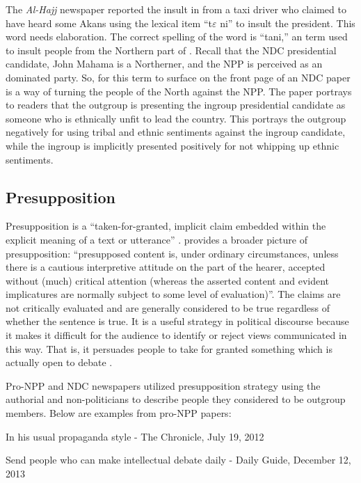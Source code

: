 \documentclass[output=paper,modfonts]{langscibook}
\begin{document}
The \textit{Al-Hajj} newspaper reported the insult in  from a taxi driver who claimed to have heard some Akans using the lexical item “t$\varepsilon $ ni” to insult the president. This word needs elaboration. The correct spelling of the word is “tani,” an  term used to insult people from the Northern part of . Recall that the NDC presidential candidate, John Mahama is a Northerner, and the NPP is perceived as an  dominated party. So, for this term to surface on the front page of an NDC paper is a way of turning the people of the North against the NPP. The paper portrays to readers that the outgroup is presenting the ingroup presidential candidate as someone who is ethnically unfit to lead the country. This portrays the outgroup negatively for using tribal and ethnic sentiments against the ingroup candidate, while the ingroup is implicitly presented positively for not whipping up ethnic sentiments.

\subsection{Presupposition}\label{sec:ofori:3.2}

Presupposition is a “taken-for-granted, implicit claim embedded within the explicit meaning of a text or utterance” \citep[63]{Richardson2007}. \citet[214]{Wodak2007} provides a broader picture of presupposition: “presupposed content is, under ordinary circumstances, unless there is a cautious interpretive attitude on the part of the hearer, accepted without (much) critical attention (whereas the asserted content and evident implicatures are normally subject to some level of evaluation)”. The claims are not critically evaluated and are generally considered to be true regardless of whether the sentence is true. It is a useful strategy in political discourse because it makes it difficult for the audience to identify or reject views communicated in this way. That is, it persuades people to take for granted something which is actually open to debate \citep{Bayram2010}.

Pro-NPP and NDC newspapers utilized presupposition strategy using the authorial  and non-politicians to describe people they considered to be outgroup members. Below are examples from pro-NPP papers:

\ea \label{ex:ofori:9}
\textup{In his usual propaganda style} - The Chronicle, July 19, 2012\z

\ea \label{ex:ofori:10}
\textup{Send people who can make intellectual debate daily} - Daily Guide, December 12, 2013\z
\end{document}
